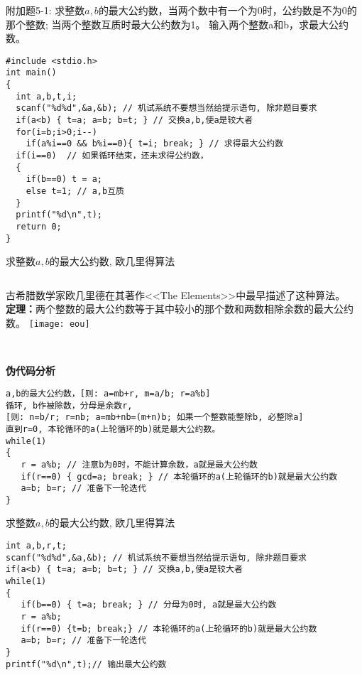 \begin{frame}
附加题5-1: 求整数$a,b$的最大公约数，当两个数中有一个为0时，公约数是不为0的那个整数; 当两个整数互质时最大公约数为1。
输入两个整数a和b，求最大公约数。 
\pause
\begin{lstlisting}
#include <stdio.h>
int main()
{
  int a,b,t,i;
  scanf("%d%d",&a,&b); // 机试系统不要想当然给提示语句, 除非题目要求 
  if(a<b) { t=a; a=b; b=t; } // 交换a,b,使a是较大者 
  for(i=b;i>0;i--)
    if(a%i==0 && b%i==0){ t=i; break; } // 求得最大公约数 
  if(i==0)  // 如果循环结束，还未求得公约数，
  {
    if(b==0) t = a;
    else t=1; // a,b互质 
  } 
  printf("%d\n",t);
  return 0;
}
\end{lstlisting}
\end{frame}

\begin{frame}{求整数$a,b$的最大公约数, 欧几里得算法}
\begin{columns}
	古希腊数学家欧几里德在其著作<<The Elements>>中最早描述了这种算法。\\
	\textbf{定理：}两个整数的最大公约数等于其中较小的那个数和两数相除余数的最大公约数。
	\texttt{[image: eou]}
\end{columns}
~\\
\textbf{伪代码分析}
\begin{lstlisting}
a,b的最大公约数，[则: a=mb+r, m=a/b; r=a%b]
循环, b作被除数，分母是余数r, 
[则: n=b/r; r=nb; a=mb+nb=(m+n)b; 如果一个整数能整除b, 必整除a]
直到r=0, 本轮循环的a(上轮循环的b)就是最大公约数。 
while(1)
{
   r = a%b; // 注意b为0时，不能计算余数，a就是最大公约数
   if(r==0) { gcd=a; break; } // 本轮循环的a(上轮循环的b)就是最大公约数
   a=b; b=r; // 准备下一轮迭代    
}
\end{lstlisting}
\end{frame}

\begin{frame}{求整数$a,b$的最大公约数, 欧几里得算法}
\begin{lstlisting}
int a,b,r,t;
scanf("%d%d",&a,&b); // 机试系统不要想当然给提示语句, 除非题目要求
if(a<b) { t=a; a=b; b=t; } // 交换a,b,使a是较大者
while(1)
{
   if(b==0) { t=a; break; } // 分母为0时, a就是最大公约数
   r = a%b; 
   if(r==0) {t=b; break;} // 本轮循环的a(上轮循环的b)就是最大公约数
   a=b; b=r; // 准备下一轮迭代   
}
printf("%d\n",t);// 输出最大公约数
\end{lstlisting}
\end{frame}

